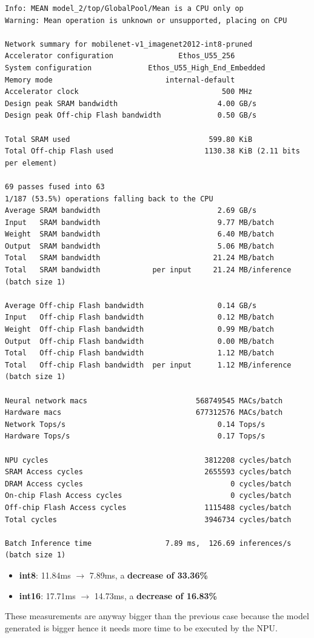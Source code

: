 \begin{lstlisting}[label={lst:vela_output_imagenet},
    caption=MobileNet v1 and ImageNet: vela output on an int8 tflite file]
Info: MEAN model_2/top/GlobalPool/Mean is a CPU only op
Warning: Mean operation is unknown or unsupported, placing on CPU

Network summary for mobilenet-v1_imagenet2012-int8-pruned
Accelerator configuration               Ethos_U55_256
System configuration             Ethos_U55_High_End_Embedded
Memory mode                          internal-default
Accelerator clock                                 500 MHz
Design peak SRAM bandwidth                       4.00 GB/s
Design peak Off-chip Flash bandwidth             0.50 GB/s

Total SRAM used                                599.80 KiB
Total Off-chip Flash used                     1130.38 KiB (2.11 bits per element)

69 passes fused into 63
1/187 (53.5%) operations falling back to the CPU
Average SRAM bandwidth                           2.69 GB/s
Input   SRAM bandwidth                           9.77 MB/batch
Weight  SRAM bandwidth                           6.40 MB/batch
Output  SRAM bandwidth                           5.06 MB/batch
Total   SRAM bandwidth                          21.24 MB/batch
Total   SRAM bandwidth            per input     21.24 MB/inference (batch size 1)

Average Off-chip Flash bandwidth                 0.14 GB/s
Input   Off-chip Flash bandwidth                 0.12 MB/batch
Weight  Off-chip Flash bandwidth                 0.99 MB/batch
Output  Off-chip Flash bandwidth                 0.00 MB/batch
Total   Off-chip Flash bandwidth                 1.12 MB/batch
Total   Off-chip Flash bandwidth  per input      1.12 MB/inference (batch size 1)

Neural network macs                         568749545 MACs/batch
Hardware macs                               677312576 MACs/batch
Network Tops/s                                   0.14 Tops/s
Hardware Tops/s                                  0.17 Tops/s

NPU cycles                                    3812208 cycles/batch
SRAM Access cycles                            2655593 cycles/batch
DRAM Access cycles                                  0 cycles/batch
On-chip Flash Access cycles                         0 cycles/batch
Off-chip Flash Access cycles                  1115488 cycles/batch
Total cycles                                  3946734 cycles/batch

Batch Inference time                 7.89 ms,  126.69 inferences/s (batch size 1)
\end{lstlisting}


\begin{itemize}
    \item \textbf{int8}: 11.84ms $\rightarrow$ 7.89ms, a \textbf{decrease of 33.36\%}
    \item \textbf{int16}: 17.71ms $\rightarrow$ 14.73ms, a \textbf{decrease of 16.83\%}
\end{itemize}

These measurements are anyway bigger than the previous case because the model
generated is bigger hence it needs more time to be executed by the NPU\@.
